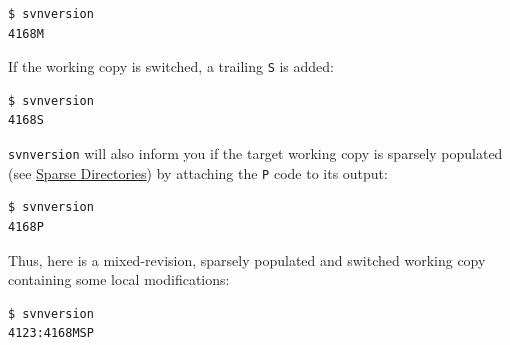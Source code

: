\begin{verbatim}
$ svnversion
4168M
\end{verbatim}

If the working copy is switched, a trailing
\textquotesingle{}\texttt{S}\textquotesingle{} is added:

\begin{verbatim}
$ svnversion
4168S
\end{verbatim}

\texttt{svnversion} will also inform you if the target working copy is
sparsely populated (see \hyperref[svn.advanced.sparsedirs]{Sparse
Directories}) by attaching the
\textquotesingle{}\texttt{P}\textquotesingle{} code to its output:

\begin{verbatim}
$ svnversion
4168P
\end{verbatim}

Thus, here is a mixed-revision, sparsely populated and switched working
copy containing some local modifications:

\begin{verbatim}
$ svnversion
4123:4168MSP
\end{verbatim}

